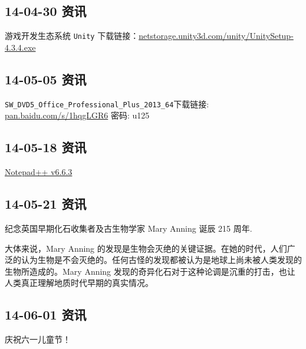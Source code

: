 \documentclass[]{report}
\begin{document}
	\subsection{14-04-30 资讯}
		游戏开发生态系统 \verb|Unity| 下载链接：\href{http://netstorage.unity3d.com/unity/UnitySetup-4.3.4.exe}{netstorage.unity3d.com/unity/UnitySetup-4.3.4.exe}
	\subsection{14-05-05 资讯}
		\verb|SW_DVD5_Office_Professional_Plus_2013_64|下载链接: \href{http://pan.baidu.com/s/1hqgLGR6}{pan.baidu.com/s/1hqgLGR6} 密码: u125
	\subsection{14-05-18 资讯}
		\href{http://notepad-plus-plus.org/zh/download/v6.6.3.html}{Notepad++ v6.6.3}	
	\subsection{14-05-21 资讯}
		纪念英国早期化石收集者及古生物学家 Mary Anning 诞辰 215 周年.
		
		大体来说，Mary Anning 的发现是生物会灭绝的关键证据。在她的时代，人们广泛的认为生物是不会灭绝的。任何古怪的发现都被认为是地球上尚未被人类发现的生物所造成的。Mary Anning 发现的奇异化石对于这种论调是沉重的打击，也让人类真正理解地质时代早期的真实情况。
	\subsection{14-06-01 资讯}
		庆祝六一儿童节！
\end{document}
